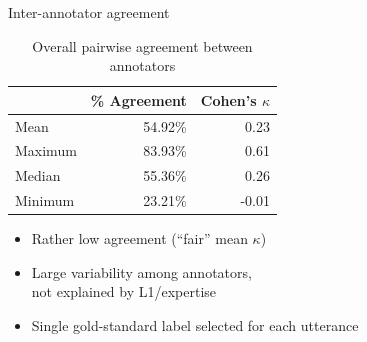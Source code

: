 \documentclass[xcolor={dvipsnames}]{beamer}
\newcommand{\TODO}[1]{{\color{red}\textbf{[TODO #1]}}}
\begin{document}
		\begin{frame}{Inter-annotator agreement}
		\begin{table}%
			\centering
			\caption{Overall pairwise agreement between annotators}
			\begin{tabular}{lrr}
			\toprule
				&	\% Agreement	&	Cohen's $\kappa$	\\
			\midrule
Mean		&	54.92\%	&	0.23	\\
Maximum	&	83.93\%	&	0.61	\\
Median		&	55.36\%	&	0.26	\\
Minimum	&	23.21\%	&	-0.01	\\
			\bottomrule
			\end{tabular}			
			\label{tab:agreement:overall}
		\end{table}
		\pause
		\begin{itemize}
		\item{Rather low agreement (``fair'' mean $\kappa$)}
		\item{Large variability among annotators, \\not explained by L1/expertise}
		\item{Single gold-standard label selected for each utterance}
		\end{itemize}
		\end{frame}	
		
%
		
\end{document}
